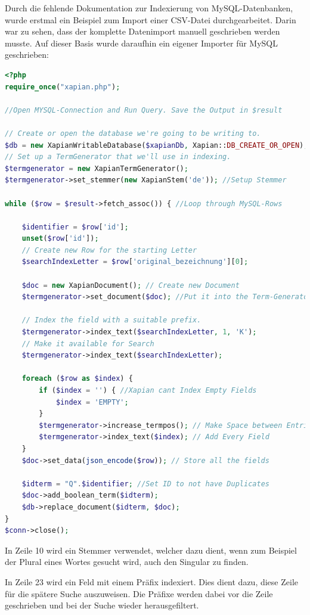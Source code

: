 Durch die fehlende Dokumentation zur Indexierung von MySQL-Datenbanken, wurde erstmal ein Beispiel zum Import einer CSV-Datei durchgearbeitet. Darin war zu sehen, dass der komplette Datenimport manuell geschrieben werden musste. Auf dieser Basis wurde daraufhin ein eigener Importer für MySQL geschrieben:
\newpage
\begin{lstlisting}[language=php, frame=single, label={lst:XapPhp}, morekeywords={type,uninvertible,indexed,stored,field,multiValued, name}, caption=Skript zur Indexierung der Daten in Xapian,captionpos=b] 
<?php
require_once("xapian.php");

//Open MYSQL-Connection and Run Query. Save the Output in $result

// Create or open the database we're going to be writing to.
$db = new XapianWritableDatabase($xapianDb, Xapian::DB_CREATE_OR_OPEN);
// Set up a TermGenerator that we'll use in indexing.
$termgenerator = new XapianTermGenerator();
$termgenerator->set_stemmer(new XapianStem('de')); //Setup Stemmer

while ($row = $result->fetch_assoc()) { //Loop through MySQL-Rows

	$identifier = $row['id'];
	unset($row['id']);
	// Create new Row for the starting Letter
	$searchIndexLetter = $row['original_bezeichnung'][0];

	$doc = new XapianDocument(); // Create new Document
	$termgenerator->set_document($doc); //Put it into the Term-Generator

	// Index the field with a suitable prefix.
	$termgenerator->index_text($searchIndexLetter, 1, 'K'); 
	// Make it available for Search
	$termgenerator->index_text($searchIndexLetter); 

	foreach ($row as $index) {
		if ($index = '') { //Xapian cant Index Empty Fields
			$index = 'EMPTY';
		}
		$termgenerator->increase_termpos(); // Make Space between Entries
		$termgenerator->index_text($index); // Add Every Field
	}
	$doc->set_data(json_encode($row)); // Store all the fields

	$idterm = "Q".$identifier; //Set ID to not have Duplicates
	$doc->add_boolean_term($idterm);
	$db->replace_document($idterm, $doc);
}
$conn->close();
\end{lstlisting}

In Zeile 10 wird ein Stemmer verwendet, welcher dazu dient, wenn zum Beispiel der Plural eines Wortes gesucht wird, auch den Singular zu finden.

In Zeile 23 wird ein Feld mit einem Präfix indexiert. Dies dient dazu, diese Zeile für die spätere Suche auszuweisen. Die Präfixe werden dabei vor die Zeile geschrieben und bei der Suche wieder herausgefiltert. 

